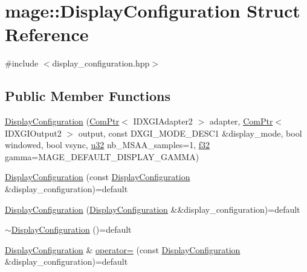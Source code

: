 \hypertarget{structmage_1_1_display_configuration}{}\section{mage\+:\+:Display\+Configuration Struct Reference}
\label{structmage_1_1_display_configuration}


{\ttfamily \#include $<$display\+\_\+configuration.\+hpp$>$}

\subsection*{Public Member Functions}
\begin{DoxyCompactItemize}
\item 
\hyperlink{structmage_1_1_display_configuration_a936a2c8674b8a6ef63373e088e29f782}{Display\+Configuration} (\hyperlink{namespacemage_ae74f374780900893caa5555d1031fd79}{Com\+Ptr}$<$ I\+D\+X\+G\+I\+Adapter2 $>$ adapter, \hyperlink{namespacemage_ae74f374780900893caa5555d1031fd79}{Com\+Ptr}$<$ I\+D\+X\+G\+I\+Output2 $>$ output, const D\+X\+G\+I\+\_\+\+M\+O\+D\+E\+\_\+\+D\+E\+S\+C1 \&display\+\_\+mode, bool windowed, bool vsync, \hyperlink{namespacemage_af2b398bf98eb10351f49cad73fe2cc73}{u32} nb\+\_\+\+M\+S\+A\+A\+\_\+samples=1, \hyperlink{namespacemage_a6a44ad388483959dc4dff9f2aef91431}{f32} gamma=M\+A\+G\+E\+\_\+\+D\+E\+F\+A\+U\+L\+T\+\_\+\+D\+I\+S\+P\+L\+A\+Y\+\_\+\+G\+A\+M\+MA)
\item 
\hyperlink{structmage_1_1_display_configuration_a1b99f5eb69a7ec1e525d551a8004f508}{Display\+Configuration} (const \hyperlink{structmage_1_1_display_configuration}{Display\+Configuration} \&display\+\_\+configuration)=default
\item 
\hyperlink{structmage_1_1_display_configuration_a5adbfbaf7de92292af56b2b56f76d548}{Display\+Configuration} (\hyperlink{structmage_1_1_display_configuration}{Display\+Configuration} \&\&display\+\_\+configuration)=default
\item 
\hyperlink{structmage_1_1_display_configuration_a91cdf4f2015177e41290238d96a55328}{$\sim$\+Display\+Configuration} ()=default
\item 
\hyperlink{structmage_1_1_display_configuration}{Display\+Configuration} \& \hyperlink{structmage_1_1_display_configuration_a43d4997e418b27add46442e88ba3672b}{operator=} (const \hyperlink{structmage_1_1_display_configuration}{Display\+Configuration} \&display\+\_\+configuration)=default
\item 

\end{DoxyCompactItemize}
